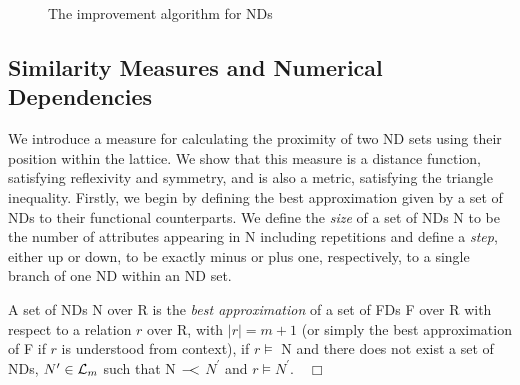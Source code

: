 {\renewcommand{\baselinestretch}{1}
\begin{figure}[ht]
\begin{center}
\end{center}
\caption{\label{numdep:fig:mu} The improvement algorithm for NDs}
\end{figure}
}

\subsection{Similarity Measures and Numerical Dependencies}

We introduce a measure for calculating the proximity of two ND sets using
their position within the lattice.  We show that this measure is a distance
function, satisfying reflexivity and symmetry, and is also a metric, 
satisfying the triangle inequality. Firstly, we begin by defining the best
approximation given by a set of NDs to their functional counterparts.
We define the {\em size} of a set of NDs N to be the number of attributes 
appearing in N including repetitions and define a {\em step}, either up
or down, to be exactly minus or plus one, respectively, to a single branch of
one ND within an ND set. 

\begin{definition}\label{def:best}
\begin{rm}
A set of NDs N over R is the {\em best approximation} of 
a set of FDs F over R with respect to a relation $r$ over R,
with $\mid r \mid = m+1$ (or simply the best approximation of F
if $r$ is understood from context), if $r \models$ N 
and there does not exist a set of NDs, $N^\prime \in {\cal L}_m$
such that N $-\!\!\!<$ $N^\prime$ and $r \models N^\prime$.$\quad\Box$
\end{rm}
\end{definition}



